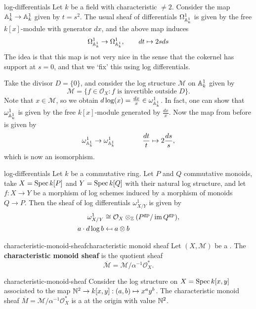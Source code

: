 \begin{example}{log-differentials}
    Let $k$ be a field with characteristic $\ne 2$. Consider the map $\AA^1_k \to \AA^1_k$ given by $t = s^2$. The usual sheaf of differentials $\Omega^1_{\AA^1_k}$ is given by the free $k[x]$-module with generator $d x$, and the above map induces
    \[ \Omega^1_{\AA^1_k} \to \Omega^1_{\AA^1_k}, \qquad d t \mapsto 2 s d s \]
    The idea is that this map is not very nice in the sense that the cokernel has support at $s = 0$, and that we `fix' this using log differentials.
    
    Take the divisor $D = \{ 0 \}$, and consider the log structure $\mathcal{M}$ on $\AA^1_k$ given by
    \[ \mathcal{M} = \{ f \in \mathcal{O}_X : f \text{ is invertible outside } D \} . \]
    Note that $x \in \mathcal{M}$, so we obtain $d \log(x) = \frac{d x}{x} \in \omega^1_{\AA^1_k}$. In fact, one can show that $\omega^1_{\AA^1_k}$ is given by the free $k[x]$-module generated by $\frac{d x}{x}$. Now the map from before is given by
    \[ \omega^1_{\AA^1_k} \to \omega^1_{\AA^1_k} \qquad  \qquad \frac{d t}{t} \mapsto 2 \frac{d s} s , \]
    which is now an isomorphism.
\end{example}

\begin{example}{log-differentials}
    Let $k$ be a commutative ring. Let $P$ and $Q$ commutative monoids, take $X = \Spec k[P]$ and $Y = \Spec k[Q]$ with their natural log structure, and let $f : X \to Y$ be a morphism of log schemes induced by a morphism of monoids $Q \to P$. Then the sheaf of log differentials $\omega^1_{X/Y}$ is given by
    \[ \begin{aligned}
        \omega^1_{X/Y} &\isom \mathcal{O}_X \otimes_\ZZ (P^\textup{gp} / \operatorname{im} Q^\textup{gp}) , \\
        a \cdot d \log b  &\mapsfrom a \otimes b
    \end{aligned} \]
\end{example}

\begin{topic}{characteristic-monoid-sheaf}{characteristic monoid sheaf}
    Let $(X, \mathcal{M})$ be a . The \textbf{characteristic monoid sheaf} is the quotient sheaf
    \[ \overline{\mathcal{M}} = \mathcal{M} / \alpha^{-1} \mathcal{O}_X^* . \]
\end{topic}

\begin{example}{characteristic-monoid-sheaf}
    Consider the log structure on $X = \Spec k[x, y]$ associated to the map $\NN^2 \to k[x, y] : (a, b) \mapsto x^a y^b$. The characteristic monoid sheaf $\overline{M} = \mathcal{M} / \alpha^{-1} \mathcal{O}_X^*$ is a  at the origin with value $\NN^2$.
\end{example}
